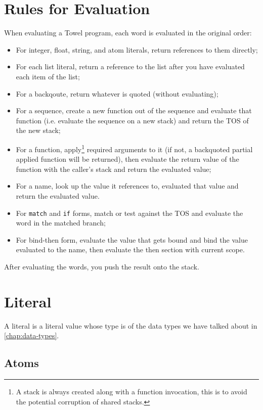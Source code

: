 \documentclass{book}
\begin{document}
\section{Rules for Evaluation}

When evaluating a Towel program, each word is evaluated in the original order:
\begin{itemize}
\item For integer, float, string, and atom literals, return references to them directly;
\item For each list literal, return a reference to the list after you have evaluated each item of the list;
\item For a backqoute, return whatever is quoted (without evaluating);
\item For a sequence, create a new function out of the sequence and evaluate that function (i.e. evaluate the sequence on a new stack) and return the TOS of the new stack;
\item For a function, apply\footnote{A stack is always created along with a function invocation, this is to avoid the potential corruption of shared stacks.} required arguments to it (if not, a backquoted partial applied function will be returned), then evaluate the return value of the function with the caller's stack and return the evaluated value;
\item For a name, look up the value it references to, evaluated that value and return the evaluated value.
\item For \texttt{match} and \texttt{if} forms, match or test against the TOS and evaluate the word in the matched branch;
\item For bind-then form, evaluate the value that gets bound and bind the value evaluated to the name, then evaluate the then section with current scope.
\end{itemize}

After evaluating the words, you push the result onto the stack.

\section{Literal}

A literal is a literal value whose type is of the data types we have talked about in \autoref{chap:data-types}.

\subsection{Atoms}
\end{document}
